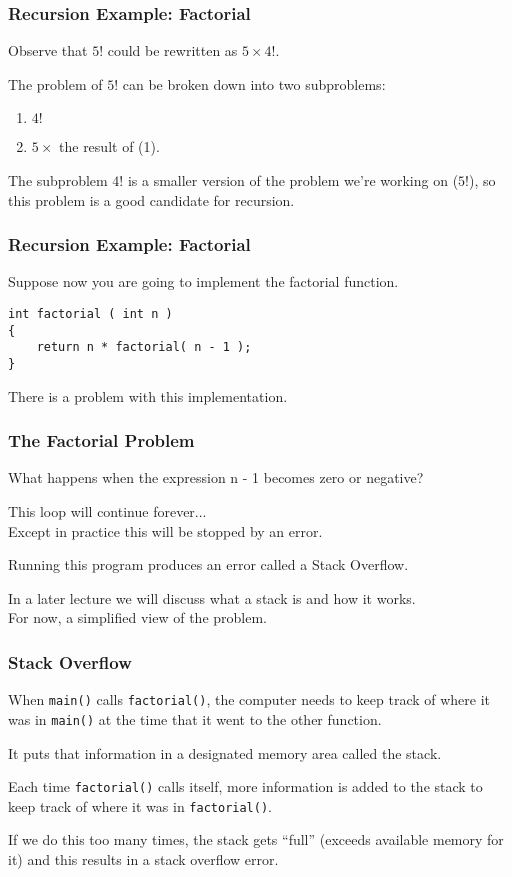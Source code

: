 \begin{frame}
\frametitle{Recursion Example: Factorial}

Observe that $5!$ could be rewritten as $5 \times 4!$.

The problem of $5!$ can be broken down into two subproblems:

\begin{enumerate}
	\item $4!$
	\item $5 \times$ the result of (1).
\end{enumerate}

The subproblem $4!$ is a smaller version of the problem we're working on ($5!$), so this problem is a good candidate for recursion.

\end{frame}

\begin{frame}[fragile]
\frametitle{Recursion Example: Factorial}
Suppose now you are going to implement the factorial function.

\begin{verbatim}
int factorial ( int n )
{
    return n * factorial( n - 1 );
}
\end{verbatim}

There is a problem with this implementation. 

\end{frame}

\begin{frame}
\frametitle{The Factorial Problem}

What happens when the expression n - 1 becomes zero or negative?

This loop will continue forever...\\
\quad Except in practice this will be stopped by an error.

Running this program produces an error called a \alert{Stack Overflow}.

In a later lecture we will discuss what a stack is and how it works.\\
\quad For now, a simplified view of the problem.


\end{frame}

\begin{frame}
\frametitle{Stack Overflow}

When \texttt{main()} calls \texttt{factorial()}, the computer needs to keep track of where it was in \texttt{main()} at the time that it went to the other function.

It puts that information in a designated memory area called the stack.

Each time \texttt{factorial()} calls itself, more information is added to the stack to keep track of where it was in \texttt{factorial()}.

If we do this too many times, the stack gets ``full'' (exceeds available memory for it) and this results in a stack overflow error.

\end{frame}


